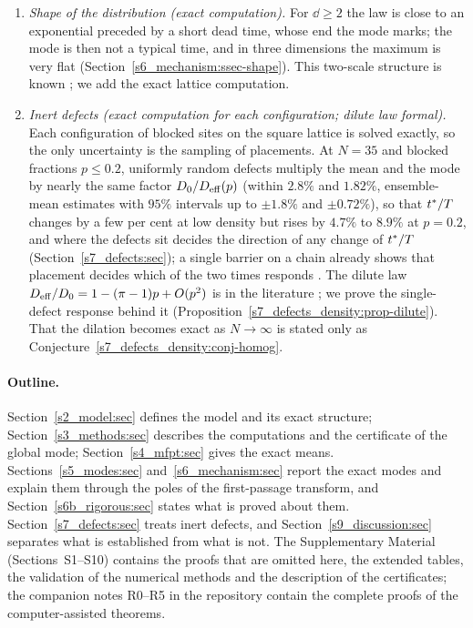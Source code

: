\begin{enumerate}
\item \emph{Shape of the distribution (exact computation).} For $\dd\ge2$ the law is close to an exponential
preceded by a short dead time, whose end the mode marks; the mode is then not a typical time, and in three
dimensions the maximum is very flat (Section~\ref{s6_mechanism:ssec-shape}). This two-scale structure is known
\citep{Benichou2010,Meyer2011,GodecMetzler2016,AldousBrown1992}; we add the exact lattice computation.

\item \emph{Inert defects (exact computation for each configuration; dilute law formal).} Each configuration of
blocked sites on the square lattice is solved exactly, so the only uncertainty is the sampling of placements.
At $N=35$ and blocked fractions $p\le0.2$, uniformly random defects multiply the mean and the mode by nearly the same
factor $D_{0}/D_{\mathrm{eff}}(p)$ (within $2.8\%$ and $1.82\%$, ensemble-mean estimates with $95\%$ intervals up to $\pm1.8\%$
and $\pm0.72\%$), so that $t^{*}/T$ changes by a few per cent at low density but rises by $4.7\%$ to $8.9\%$ at
$p=0.2$, and where the defects sit decides the direction of any change of $t^{*}/T$ (Section~\ref{s7_defects:sec}); a
single barrier on a chain already shows that placement decides which of the two times responds
\citep{SarvaharmanGiuggioli2023}.
The dilute law
$D_{\mathrm{eff}}/D_{0}=1-(\pi-1)p+O(p^{2})$ is in the literature \citep{WatsonLeath1974,Nieuwenhuizen1986,Ernst1987};
we prove the single-defect response behind it (Proposition~\ref{s7_defects_density:prop-dilute}). That the dilation
becomes exact as $N\to\infty$ is stated only as Conjecture~\ref{s7_defects_density:conj-homog}.
\end{enumerate}
\endgroup

\paragraph{Outline.}
Section~\ref{s2_model:sec} defines the model and its exact structure; Section~\ref{s3_methods:sec} describes the
computations and the certificate of the global mode; Section~\ref{s4_mfpt:sec} gives the exact means.
Sections~\ref{s5_modes:sec} and~\ref{s6_mechanism:sec} report the exact modes and explain them through the poles of
the first-passage transform, and Section~\ref{s6b_rigorous:sec} states what is proved about them.
Section~\ref{s7_defects:sec} treats inert defects, and Section~\ref{s9_discussion:sec} separates what is established
from what is not. The Supplementary Material (Sections~S1--S10) contains the proofs that are omitted here,
the extended tables, the validation of the numerical methods and the description of the certificates; the companion
notes R0--R5 in the repository \citep{ZhouyiRepo} contain the complete proofs of the computer-assisted theorems.
